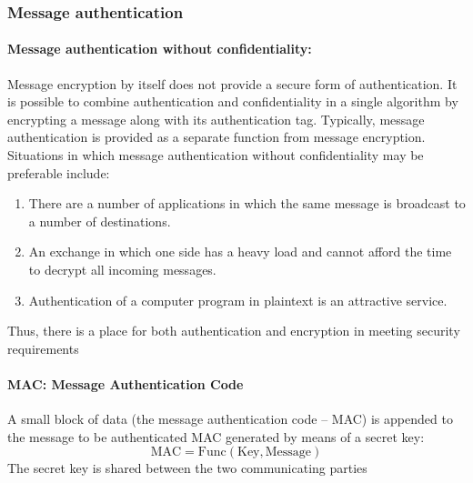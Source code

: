 \documentclass{article}
\begin{document}
                            \subsubsection{Message authentication}
                                \paragraph{Message authentication without confidentiality:}
                                        Message encryption by itself does not provide a secure form of authentication. It is possible to combine authentication and confidentiality in a single algorithm by encrypting a message along with its authentication tag. Typically, message authentication is provided as a separate function from message encryption.
                                        Situations in which message authentication without confidentiality
                                        may be preferable include:
                                        \begin{enumerate}
                                            \item There are a number of applications in which the same message is broadcast to a number of destinations.
                                            \item An exchange in which one side has a heavy load and cannot afford the time to decrypt all incoming messages.
                                            \item Authentication of a computer program in plaintext is an attractive service.
                                        \end{enumerate}
                                        Thus, there is a place for both authentication and encryption in
                                        meeting security requirements
                                \paragraph{MAC: Message Authentication Code}
                                A small block of data (the message authentication code –
                                MAC) is appended to the message to be authenticated
                                 MAC generated by means of a secret key: 
                                    \[
                                    \text{MAC} = \text{Func}(\text{Key}, \text{Message})
                                    \]
                                    The secret key is shared between the two communicating
                                    parties
\end{document}
